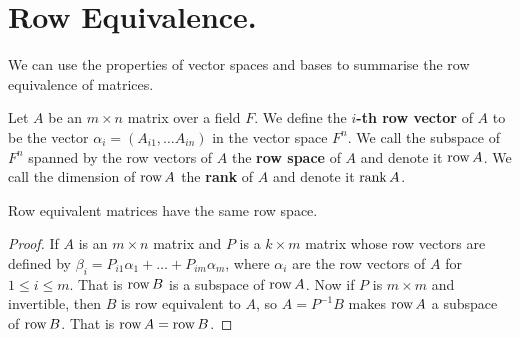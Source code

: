 
\section{Row Equivalence.}

We can use the properties of vector spaces and bases to 
summarise the row equivalence of matrices.

\begin{definition}
    Let $A$ be an  $m \times n$ matrix over a field  $F$. We 
    define the $i$\textbf{-th row vector} of $A$ to be the 
    vector  $\alpha_i=(A_{i1}, \dots A_{in})$ in the vector 
    space $F^n$. We call the subspace of $F^n$ spanned by the 
    row vectors of  $A$ the  \textbf{row space} of $A$ and 
    denote it $\operatorname{row}{A}$. We call the dimension of $\operatorname{row}{A}$ 
    the \textbf{rank} of $A$ and denote it  $\operatorname{rank}{A}$.
\end{definition}

\begin{theorem}\label{2.7.1}
    Row equivalent matrices have the same row space.
\end{theorem}
\begin{proof}
    If $A$ is an  $m \times n $ matrix and $P$ is a  
    $k \times m$ matrix whose row vectors are defined by 
    $\beta_i=P_{i1}\alpha_1+\dots+P_{im}\alpha_m$, where 
    $\alpha_i$ are the row vectors of  $A$ for  $1 \leq i 
    \leq m$. That is  $\operatorname{row}{B}$ is a subspace of $\operatorname{row}{A}$. 
    Now if $P$ is  $m \times m$ and invertible, then  $B$ is 
    row equivalent to  $A$, so  $A=P^{-1}B$ makes $\operatorname{row}{A}$ 
    a subspace of $\operatorname{row}{B}$. That is $\operatorname{row}{A}=\operatorname{row}{B}$.
\end{proof}

